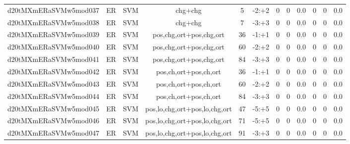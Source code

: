 \documentclass[a4paper]{article}
\begin{document}
\begin{landscape}
\begin{center}
\begin{tabular}{ |c|c|c|c|c|c|c|c|c|c|c|c|}
 
 	
 	\small{ d20tMXmERaSVMw5mod037 } & ER & SVM & chg+chg  &  5 &  -2:+2  &  0 & 0 & 0.0  &  0 & 0 & 0.0 \\
 	

 
 	
 	\small{ d20tMXmERaSVMw5mod038 } & ER & SVM & chg+chg  &  7 &  -3:+3  &  0 & 0 & 0.0  &  0 & 0 & 0.0 \\
 	

 
 	
 	\small{ d20tMXmERaSVMw5mod039 } & ER & SVM & pos,chg,ort+pos,chg,ort  &  36 &  -1:+1  &  0 & 0 & 0.0  &  0 & 0 & 0.0 \\
 	

 
 	
 	\small{ d20tMXmERaSVMw5mod040 } & ER & SVM & pos,chg,ort+pos,chg,ort  &  60 &  -2:+2  &  0 & 0 & 0.0  &  0 & 0 & 0.0 \\
 	

 
 	
 	\small{ d20tMXmERaSVMw5mod041 } & ER & SVM & pos,chg,ort+pos,chg,ort  &  84 &  -3:+3  &  0 & 0 & 0.0  &  0 & 0 & 0.0 \\
 	

 
 	
 	\small{ d20tMXmERaSVMw5mod042 } & ER & SVM & pos,ch,ort+pos,ch,ort  &  36 &  -1:+1  &  0 & 0 & 0.0  &  0 & 0 & 0.0 \\
 	

 
 	
 	\small{ d20tMXmERaSVMw5mod043 } & ER & SVM & pos,ch,ort+pos,ch,ort  &  60 &  -2:+2  &  0 & 0 & 0.0  &  0 & 0 & 0.0 \\
 	

 
 	
 	\small{ d20tMXmERaSVMw5mod044 } & ER & SVM & pos,ch,ort+pos,ch,ort  &  84 &  -3:+3  &  0 & 0 & 0.0  &  0 & 0 & 0.0 \\
 	

 
 	
 	\small{ d20tMXmERaSVMw5mod045 } & ER & SVM & pos,lo,chg,ort+pos,lo,chg,ort  &  47 &  -5:+5  &  0 & 0 & 0.0  &  0 & 0 & 0.0 \\
 	

 
 	
 	\small{ d20tMXmERaSVMw5mod046 } & ER & SVM & pos,lo,chg,ort+pos,lo,chg,ort  &  71 &  -5:+5  &  0 & 0 & 0.0  &  0 & 0 & 0.0 \\
 	

 
 	
 	\small{ d20tMXmERaSVMw5mod047 } & ER & SVM & pos,lo,chg,ort+pos,lo,chg,ort  &  91 &  -3:+3  &  0 & 0 & 0.0  &  0 & 0 & 0.0 \\
 	


\end{tabular}
\end{center}
\end{landscape}
\end{document}
